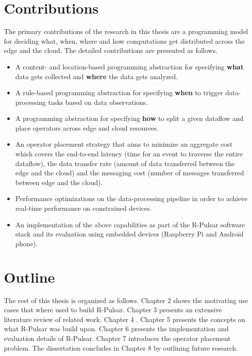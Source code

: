 \section{Contributions}
The primary contributions of the research in this thesis are a programming model for deciding what, when, where and how computations get distributed across the edge and the cloud. The detailed contributions are presented as follows.
\begin{itemize}
  \item A content- and location-based programming abstraction for specifying \textbf{what} data gets collected and \textbf{where} the data gets analyzed.
  \item A rule-based programming abstraction for specifying \textbf{when} to trigger data-processing tasks based on data observations.
  \item A programming abstraction for specifying \textbf{how} to split a given dataflow and place operators across edge and cloud resources.
  \item An operator placement strategy that aims to minimize an aggregate cost which covers the end-to-end latency (time for an event to traverse the entire dataflow), the data transfer rate (amount of data transferred between the edge and the cloud) and the messaging cost (number of messages transferred between edge and the cloud).
  \item Performance optimizations on the data-processing pipeline in order to achieve real-time performance on constrained devices.
  \item An implementation of the above capabilities as part of the R-Pulsar software stack and its evaluation using embedded devices (Raspberry Pi and Android phone).
\end{itemize}

\section{Outline}
The rest of this thesis is organized as follows. Chapter 2 shows the motivating use cases that where used to build R-Pulsar. Chapter 3 presents an extensive literature review of related work. Chapter 4 . Chapter 5 presents the concepts on what R-Pulsar was build upon. Chapter 6 presents the implementation and evaluation details of R-Pulsar. Chapter 7 introduces the operator placement problem. The dissertation concludes in Chapter 8 by outlining future research.
